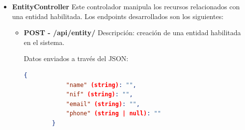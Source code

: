 \begin{itemize}
\begin{itemize}
        Respuesta: se devuelve un JSON con la información del usuario confirmado.

        \item \textbf{POST - /api/auth/login} \newline
        Descripción: inicio de sesión de un usuario en el sistema. 
        
        Datos enviados a través de un JSON:
        \begin{lstlisting}[language=json,caption={Inicio de sesión}]
        {
            "email" (string): "",
            "password" (string): ""
        }
        \end{lstlisting}

        Respuesta: se devuelve un JSON con el token de acceso y el token de refresco. El token de acceso contiene información cifrada del usuario que permite identificarlo, sabiendo de esta forma si está 
        autorizado a acceder a la información que solicita.

        \item \textbf{POST - /api/auth/refresh} \newline
        Descripción: creación de nuevo token de acceso y token de refresco.

        Datos enviados: token en la cabecera (headers) de la petición.

        Resuesta: se devuelve un JSSON con un nuevo token de acceso y token de refresco.
    \end{itemize}

    \item \textbf{EntityController}
    \newline
    Este controlador manipula los recursos relacionados con una entidad habilitada. Los endpoints desarrollados son los siguientes:

    \begin{itemize}
        \item \textbf{POST - /api/entity/} \newline
        Descripción: creación de una entidad habilitada en el sistema. 
        
        Datos enviados a través del JSON:
        \begin{lstlisting}[language=json,caption={Creación de entidad habilitada}]
        {
            "name" (string): "",
            "nif" (string): "",
            "email" (string): "",
            "phone" (string | null): ""
        }
        \end{lstlisting}


\end{itemize}
\end{itemize}
